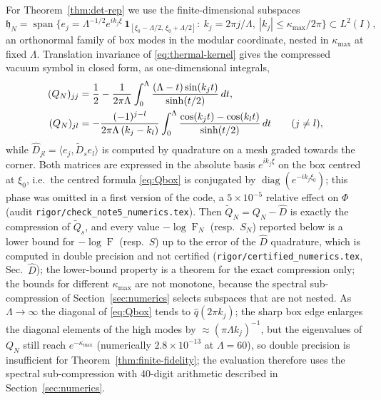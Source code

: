 \documentclass[11pt]{article}
\theoremstyle{accent}
\theoremstyle{definition}
\newcommand{\Fid}{\operatorname{F}}
\begin{document}
For Theorem~\ref{thm:det-rep} we use the finite-dimensional subspaces
\[
 \mathfrak h_N=\operatorname{span}\bigl\{e_j=\Lambda^{-1/2}e^{ik_j\xi}\,\mathbf 1_{[\xi_0-\Lambda/2,\,\xi_0+\Lambda/2]}:\ k_j=2\pi j/\Lambda,\ |k_j|\le\kappa_{\max}/2\pi\bigr\}\subset L^2(I),
\]
an orthonormal family of box modes in the modular coordinate, nested in \(\kappa_{\max}\) at fixed \(\Lambda\).  Translation invariance of \eqref{eq:thermal-kernel} gives the compressed vacuum symbol in closed form, as one-dimensional integrals,
\begin{align}
 (Q_N)_{jj}&=\frac12-\frac{1}{2\pi\Lambda}\int_0^\Lambda\frac{(\Lambda-t)\sin(k_jt)}{\sinh(t/2)}\,dt,\label{eq:Qbox}\\
 (Q_N)_{jl}&=-\frac{(-1)^{j-l}}{2\pi\Lambda\,(k_j-k_l)}\int_0^\Lambda\frac{\cos(k_jt)-\cos(k_lt)}{\sinh(t/2)}\,dt\qquad(j\ne l),\notag
\end{align}
while \(\widehat D_{jl}=\langle e_j,\widetilde D_se_l\rangle\) is computed by quadrature on a mesh graded towards the corner.  Both matrices are expressed in the absolute basis \(e^{ik_j\xi}\) on the box centred at \(\xi_0\), i.e.\ the centred formula \eqref{eq:Qbox} is conjugated by \(\operatorname{diag}(e^{-ik_j\xi_0})\); this phase was omitted in a first version of the code, a \(5\times10^{-5}\) relative effect on \(\Phi\) (audit \texttt{rigor/check\_note5\_numerics.tex}).  Then \(\widetilde Q_N=Q_N-\widehat D\) is exactly the compression of \(\widetilde Q_s\), and every value \(-\log\Fid_N\) (resp.\ \(S_N\)) reported below is a lower bound for \(-\log\Fid\) (resp.\ \(S\)) up to the error of the \(\widehat D\) quadrature, which is computed in double precision and not certified (\texttt{rigor/certified\_numerics.tex}, Sec.~\(\widehat D\)); the lower-bound property is a theorem for the exact compression only; the bounds for different \(\kappa_{\max}\) are not monotone, because the spectral sub-compression of Section~\ref{sec:numerics} selects subspaces that are not nested.  As \(\Lambda\to\infty\) the diagonal of \eqref{eq:Qbox} tends to \(\widehat q(2\pi k_j)\); the sharp box edge enlarges the diagonal elements of the high modes by \(\approx(\pi\Lambda k_j)^{-1}\), but the eigenvalues of \(Q_N\) still reach \(e^{-\kappa_{\max}}\) (numerically \(2.8\times10^{-13}\) at \(\Lambda=60\)), so double precision is insufficient for Theorem~\ref{thm:finite-fidelity}; the evaluation therefore uses the spectral sub-compression with 40-digit arithmetic described in Section~\ref{sec:numerics}.
\end{document}
